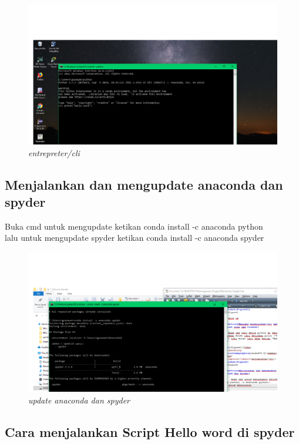\begin{figure}[!htbp]
    \centering
    \includegraphics[scale=0.3]{gambar/cli.png}
    \caption{\textit{entrepreter/cli}}
    \label{Figure1}
\end{figure}

\subsection{Menjalankan dan mengupdate anaconda dan spyder}

\par   Buka cmd untuk mengupdate ketikan conda install -c anaconda python\\
lalu untuk mengupdate spyder ketikan conda install -c anaconda spyder


\begin{figure}[!htbp]
    \centering
    \includegraphics[scale=0.3]{gambar/spydernew.png}
    \caption{\textit{update anaconda dan spyder}}
    \label{Figure3331}
\end{figure}


\subsection{Cara menjalankan Script Hello word di spyder}

